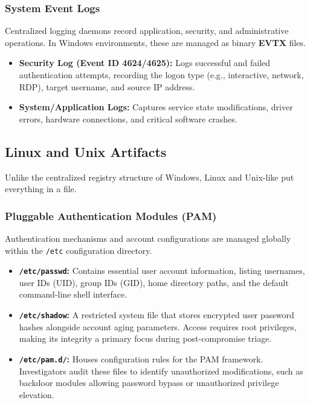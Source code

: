 \subsubsection*{System Event Logs}
Centralized logging daemons record application, security, and administrative operations. In Windows environments, these are managed as binary \textbf{EVTX} files.
\begin{itemize}
    \item \textbf{Security Log (Event ID 4624/4625):} Logs successful and failed authentication attempts, recording the logon type (e.g., interactive, network, RDP), target username, and source IP address.
    \item \textbf{System/Application Logs:} Captures service state modifications, driver errors, hardware connections, and critical software crashes.
\end{itemize}

\subsection{Linux and Unix Artifacts}

Unlike the centralized registry structure of Windows, Linux and Unix-like put everything in a file.\\


\subsubsection*{Pluggable Authentication Modules (PAM)}
Authentication mechanisms and account configurations are managed globally within the \texttt{/etc} configuration directory.
\begin{itemize}
    \item \textbf{\texttt{/etc/passwd}:} Contains essential user account information, listing usernames, user IDs (UID), group IDs (GID), home directory paths, and the default command-line shell interface.
    \item \textbf{\texttt{/etc/shadow}:} A restricted system file that stores encrypted user password hashes alongside account aging parameters. Access requires root privileges, making its integrity a primary focus during post-compromise triage.
    \item \textbf{\texttt{/etc/pam.d/}:} Houses configuration rules for the PAM framework. Investigators audit these files to identify unauthorized modifications, such as backdoor modules allowing password bypass or unauthorized privilege elevation.
\end{itemize}

